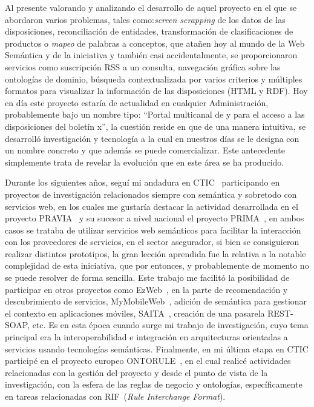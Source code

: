Al presente valorando y analizando el desarrollo de aquel proyecto en el que se abordaron varios problemas, tales como:\textit{screen scrapping} de los datos de las disposiciones, reconciliación de entidades, transformación de clasificaciones de productos o \textit{mapeo} de palabras a conceptos, 
que atañen hoy al mundo de la Web Semántica y de la iniciativa \linkeddata y también casi accidentalmente, se proporcionaron 
servicios como suscripción \gls{RSS} a un consulta, navegación gráfica sobre las ontologías de dominio, búsqueda contextualizada por varios criterios
y múltiples formatos para visualizar la información de las disposiciones (\gls{HTML} y \gls{RDF}). Hoy en día este proyecto estaría
de actualidad en cualquier Administración, probablemente bajo un nombre tipo: ``Portal multicanal de \opendata y \linkeddata para el acceso a las disposiciones
del boletín x'', la cuestión reside en que de una manera intuitiva, se desarrolló investigación y tecnología a la cual en nuestros días
se le designa con un nombre concreto y que además se puede comercializar. Este antecedente simplemente trata de revelar la evolución 
que en este área se ha producido. 

Durante los siguientes años, seguí mi andadura en CTIC~\cite{ctic} participando en proyectos de investigación relacionados 
siempre con semántica y sobretodo con servicios web, en los cuales me gustaría destacar la actividad desarrollada 
en el proyecto PRAVIA~\cite{pravia} y su sucesor a nivel nacional el proyecto PRIMA~\cite{prima}, en ambos casos se trataba de utilizar servicios web semánticos para facilitar la interacción con los proveedores de servicios, en el sector 
asegurador, si bien se consiguieron realizar distintos prototipos, la gran lección aprendida fue
la relativa a la notable complejidad de esta iniciativa, que por entonces, y probablemente de momento no se puede resolver de forma
sencilla. Este trabajo me facilitó la posibilidad de participar en otros proyectos como EzWeb~\cite{ezweb}, en la parte de recomendación
y descubrimiento de servicios, MyMobileWeb~\cite{mymobileweb}, adición de semántica para gestionar el contexto en 
aplicaciones móviles, SAITA~\cite{saita}, creación de una pasarela \gls{REST}-\gls{SOAP}, etc. Es en esta época cuando surge mi trabajo de investigación,
 cuyo tema principal era la interoperabilidad e integración en arquitecturas orientadas a servicios usando tecnologías semánticas. 
Finalmente, en mi última etapa en CTIC participé en el proyecto europeo ONTORULE~\cite{ontorule}, en el cual realicé actividades 
relacionadas con la gestión del proyecto y desde el punto de vista de la investigación, con la esfera de las reglas de negocio y ontologías, 
específicamente en tareas relacionadas con \gls{RIF}~\cite{rif-core}(\textit{Rule Interchange Format}).

